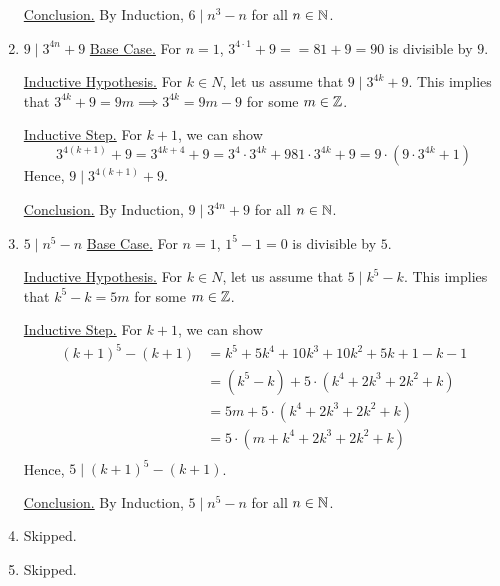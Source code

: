 \begin{enumerate}
		\underline{Conclusion.}
		By Induction, $6 \mid n^3 - n$ for all $n \in \mathbb{N}$.

		\es

	
	\item $9 \mid 3^{4n} + 9$
		\bs
		\underline{Base Case.} For $n = 1$, $3^{4 \cdot 1} + 9 == 81 + 9 = 90$ is divisible by $9$.

		\underline{Inductive Hypothesis.}
		For $k \in N$, let us assume that $9 \mid 3^{4k} + 9$. This implies that $3^{4k} + 9 = 9m \implies 3^{4k} = 9m-9$ for some $m \in \mathbb{Z}$.

		\underline{Inductive Step.}
		For $k+1$, we can show
		$$3^{4(k+1)} + 9 = 3^{4k+4} + 9 = 3^4 \cdot 3^{4k} + 9 
		81 \cdot 3^{4k} + 9 = 9 \cdot (9 \cdot 3^{4k} + 1)$$
		Hence, $9 \mid 3^{4(k+1)}+9$.

		\underline{Conclusion.}
		By Induction, $9 \mid 3^{4n} + 9$ for all $n \in \mathbb{N}$.

		\es

	\item $5 \mid n^5 - n$
		\bs
		\underline{Base Case.} For $n = 1$, $1^5 - 1 = 0$ is divisible by $5$.

		\underline{Inductive Hypothesis.}
		For $k \in N$, let us assume that $5 \mid k^5 - k$. This implies that $k^5 - k = 5m$ for some $m \in \mathbb{Z}$.

		\underline{Inductive Step.}
		For $k+1$, we can show
		\begin{align*}
			(k+1)^5 - (k+1) 
				&= k^5 + 5k^4 + 10k^3 + 10k^2 + 5k + 1 - k - 1 \\
				&= (k^5 - k) + 5 \cdot (k^4 + 2k^3 + 2k^2 + k) \\
				&= 5m + 5 \cdot (k^4 + 2k^3 + 2k^2 + k) \\
				&= 5 \cdot (m + k^4 + 2k^3 + 2k^2 + k) \\
		\end{align*}
		Hence, $5 \mid (k+1)^5 - (k+1)$.

		\underline{Conclusion.}
		By Induction, $5 \mid n^5 - n$ for all $n \in \mathbb{N}$.
		\es
		
	\item Skipped.
	\item Skipped.

\end{enumerate}
\ep


